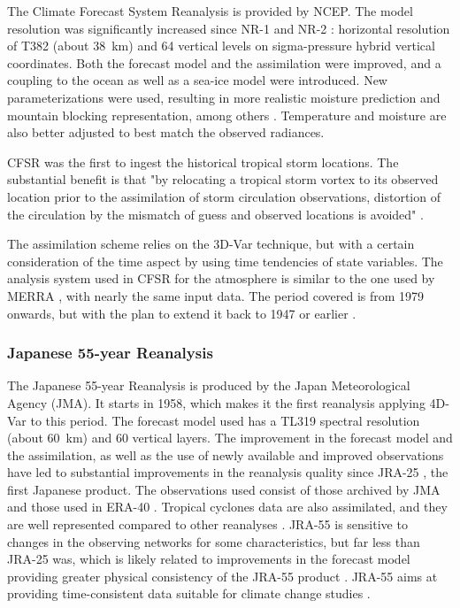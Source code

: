 \documentclass{ametsoc}
\begin{document}
The Climate Forecast System Reanalysis \citep[CFSR --][]{Saha2010a} is provided by NCEP. The model resolution was significantly increased since NR-1 and NR-2 : horizontal resolution of T382 (about 38~km) and 64 vertical levels on sigma-pressure hybrid vertical coordinates. Both the forecast model and the assimilation were improved, and a coupling to the ocean as well as a sea-ice model were introduced. New parameterizations were used, resulting in more realistic moisture prediction and mountain blocking representation, among others \citep{Saha2010a}. Temperature and moisture are also better adjusted to best match the observed radiances.

CFSR was the first to ingest the historical tropical storm locations. The substantial benefit is that "by relocating a tropical storm vortex to its observed location prior to the assimilation of storm circulation observations, distortion of the circulation by the mismatch of guess and observed locations is avoided" \citep{Saha2010a}.

The assimilation scheme relies on the 3D-Var technique, but with a certain consideration of the time aspect by using time tendencies of state variables. The analysis system used in CFSR for the atmosphere is similar to the one used by MERRA \citep{Rienecker2011}, with nearly the same input data. The period covered is from 1979 onwards, but with the plan to extend it back to 1947 or earlier \citep{Saha2010a}.


\subsubsection{Japanese 55-year Reanalysis}

The Japanese 55-year Reanalysis \citep[JRA-55 --][]{Kobayashi2015, Harada2016} is produced by the Japan Meteorological Agency (JMA). It starts in 1958, which makes it the first reanalysis applying 4D-Var to this period. The forecast model used has a TL319 spectral resolution (about 60~km) and 60 vertical layers. The improvement in the forecast model and the assimilation, as well as the use of newly available and improved observations have led to substantial improvements in the reanalysis quality since JRA-25 \citep{Onogi2007}, the first Japanese product. The observations used consist of those archived by JMA and those used in ERA-40 \citep{Uppala2005}. Tropical cyclones data are also assimilated, and they are well represented compared to other reanalyses \citep{Harada2016}. JRA-55 is sensitive to changes in the observing networks for some characteristics, but far less than JRA-25 was, which is likely related to improvements in the forecast model providing greater physical consistency of the JRA-55 product \citep{Kobayashi2015}. JRA-55 aims at providing time-consistent data suitable for climate change studies \citep{Ebita2011}.
\end{document}
